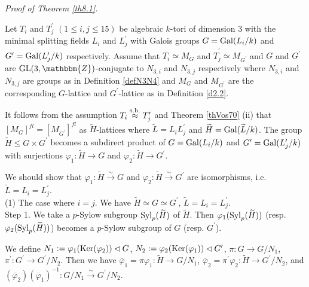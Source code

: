 \documentclass{amsart}
\theoremstyle{plain}
\theoremstyle{definition}
\theoremstyle{remark}
\newcommand{\bZ}{\mathbbm{Z}}\newcommand{\bQ}{\mathbbm{Q}}
\newcommand{\GL}{{\rm GL}}\newcommand{\SL}{{\rm SL}}
\newcommand{\Syl}{{\rm Syl}}
\newcounter{sub}\def\tr{\mbox{tr }}
\begin{document}
{%
{\it Proof of Theorem \ref{th8.1}.} 

Let $T_i$ and $T_j^\prime$ $(1\leq i,j\leq 15)$ 
be algebraic $k$-tori of dimension $3$ with the minimal splitting fields 
$L_i$ and $L_j^\prime$ 
with Galois groups 
$G={\rm Gal}(L_i/k)$ and $G^\prime={\rm Gal}(L_j^\prime/k)$ respectively. 
Assume that 
$\widehat{T}_i\simeq M_G$ and $\widehat{T}^\prime_j\simeq M_{G^\prime}$
and $G$ and $G^\prime$ are 
$\GL(3,\bZ)$-conjugate to $N_{3,i}$ and $N_{3,j}$ respectively 
where $N_{3,i}$ and $N_{3,j}$ are groups as in Definition \ref{defN3N4} 
and $M_G$ and $M_{G^\prime} $ are the corresponding $G$-lattice 
and $G^\prime$-lattice as in Definition \ref{d2.2}. 
%

It follows from the assumption $T_i\stackrel{\rm s.b.}{\approx} T_j^\prime$ 
and Theorem \ref{thVos70} (ii) that %
$[M_G]^{fl}=[M_{G^\prime}]^{fl}$ as $\widetilde{H}$-lattices where 
$\widetilde{L}=L_iL_j^\prime$ 
and $\widetilde{H}={\rm Gal}(\widetilde{L}/k)$. 
The group $\widetilde{H}\leq G\times G^\prime$ becomes a 
subdirect product of $G={\rm Gal}(L_i/k)$ and 
$G^\prime={\rm Gal}(L^\prime_j/k)$ with 
surjections $\varphi_1:\widetilde{H}\rightarrow G$ and 
$\varphi_2:\widetilde{H}\rightarrow G^\prime$. 

We should show that 
$\varphi_1:\widetilde{H}\xrightarrow{\sim} G$ and 
$\varphi_2:\widetilde{H}\xrightarrow{\sim} G^\prime$ 
are isomorphisms, i.e. 
$\widetilde{L}=L_i=L_j^\prime$.\\

(1) The case where $i=j$. 
We have $\widetilde{H}\simeq G\simeq G^\prime$, 
$\widetilde{L}=L_i=L_j^\prime$.\\

Step 1. 
We take a $p$-Sylow subgroup $\Syl_p(\widetilde{H})$ of $\widetilde{H}$. 
Then $\varphi_1(\Syl_p(\widetilde{H}))$ 
(resp. $\varphi_2(\Syl_p(\widetilde{H}))$) 
becomes a $p$-Sylow subgroup of $G$ (resp. $G^\prime$). 

We define 
$N_1:=\varphi_1({\rm Ker}(\varphi_2))\lhd G$, 
$N_2:=\varphi_2({\rm Ker}(\varphi_1))\lhd G^\prime$, 
$\pi:G\rightarrow G/N_1$, 
$\pi^\prime:G^\prime\rightarrow G^\prime/N_2$. 
Then we have 
$\overline{\varphi}_1=\pi\varphi_1: \widetilde{H}\rightarrow G/N_1$, 
$\overline{\varphi}_2=\pi^\prime\varphi_2: 
\widetilde{H}\rightarrow G^\prime/N_2$, 
and $(\overline{\varphi}_2)(\overline{\varphi}_1)^{-1}:
G/N_1\xrightarrow{\sim}G^\prime/N_2$. 

}
\end{document}
